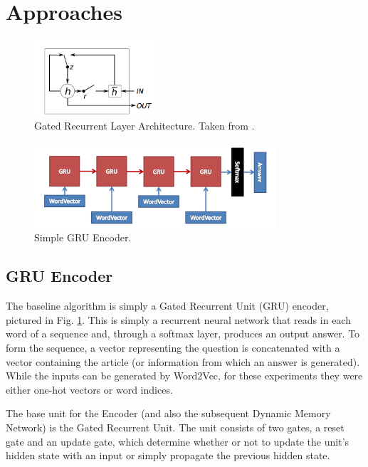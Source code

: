\documentclass{article}
\begin{document}
\section{Approaches}

\begin{figure}[!ht]
  \centering
    \includegraphics[width=0.4\textwidth]{images/GRU}
      \caption{Gated Recurrent Layer Architecture.  Taken from \cite{gru}.}    
\end{figure}


\begin{figure}[!ht]
\label{Fig:gru_encoder}
  \centering
    \includegraphics[width=0.8\textwidth]{images/GRU_encoder}
      \caption{Simple GRU Encoder.}    
\end{figure}


\subsection{GRU Encoder}

The baseline algorithm is simply a Gated Recurrent Unit (GRU) encoder, pictured in Fig. \ref{Fig:gru_encoder}.  This is simply a recurrent neural network that reads in each word of a sequence and, through a softmax layer, produces an output answer.  To form the sequence, a vector representing the question is concatenated with a vector containing the article (or information from which an answer is generated).  While the inputs can be generated by Word2Vec, for these experiments they were either one-hot vectors or word indices.  \par
The base unit for the Encoder (and also the subsequent Dynamic Memory Network) is the Gated Recurrent Unit.  The unit consists of two gates, a reset gate and an update gate, which determine whether or not to update the unit's hidden state with an input or simply propagate the previous hidden state.  
\end{document}
